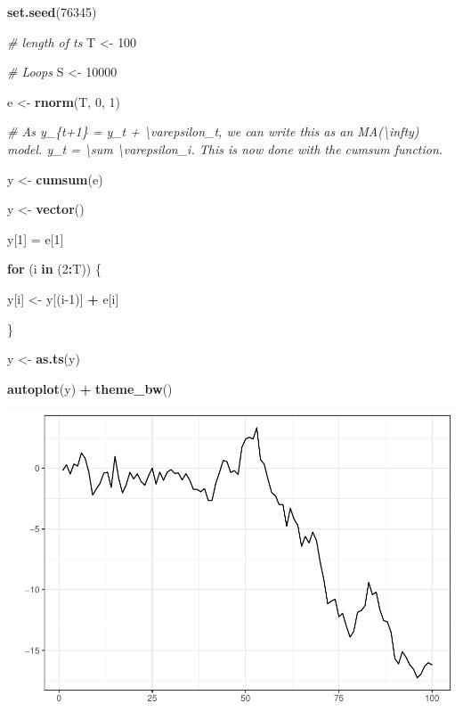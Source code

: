 \documentclass[
]{article}
\newenvironment{Shaded}{\begin{snugshade}}{\end{snugshade}}
\newcommand{\CommentTok}[1]{\textcolor[rgb]{0.56,0.35,0.01}{\textit{#1}}}
\newcommand{\ControlFlowTok}[1]{\textcolor[rgb]{0.13,0.29,0.53}{\textbf{#1}}}
\newcommand{\DecValTok}[1]{\textcolor[rgb]{0.00,0.00,0.81}{#1}}
\newcommand{\KeywordTok}[1]{\textcolor[rgb]{0.13,0.29,0.53}{\textbf{#1}}}
\newcommand{\NormalTok}[1]{#1}
\newcommand{\OperatorTok}[1]{\textcolor[rgb]{0.81,0.36,0.00}{\textbf{#1}}}
\newcommand{\StringTok}[1]{\textcolor[rgb]{0.31,0.60,0.02}{#1}}
\begin{document}
\begin{Shaded}
\begin{Highlighting}[]
\KeywordTok{set.seed}\NormalTok{(}\DecValTok{76345}\NormalTok{)}

\CommentTok{# length of ts}
\NormalTok{T <-}\StringTok{ }\DecValTok{100}

\CommentTok{# Loops}
\NormalTok{S <-}\StringTok{ }\DecValTok{10000}

\NormalTok{e <-}\StringTok{ }\KeywordTok{rnorm}\NormalTok{(T, }\DecValTok{0}\NormalTok{, }\DecValTok{1}\NormalTok{)}

\CommentTok{# As y_\{t+1\} = y_t + \textbackslash{}varepsilon_t, we can write this as an MA(\textbackslash{}infty) model. y_t = \textbackslash{}sum \textbackslash{}varepsilon_i. This is now done with the cumsum function.}

\NormalTok{y <-}\StringTok{ }\KeywordTok{cumsum}\NormalTok{(e)}

\NormalTok{y <-}\StringTok{ }\KeywordTok{vector}\NormalTok{()}

\NormalTok{y[}\DecValTok{1}\NormalTok{] =}\StringTok{ }\NormalTok{e[}\DecValTok{1}\NormalTok{]}

\ControlFlowTok{for}\NormalTok{ (i }\ControlFlowTok{in}\NormalTok{ (}\DecValTok{2}\OperatorTok{:}\NormalTok{T)) \{}

\NormalTok{    y[i] <-}\StringTok{ }\NormalTok{y[(i}\DecValTok{-1}\NormalTok{)] }\OperatorTok{+}\StringTok{ }\NormalTok{e[i]}

\NormalTok{\}}

\NormalTok{y <-}\StringTok{ }\KeywordTok{as.ts}\NormalTok{(y)}

\KeywordTok{autoplot}\NormalTok{(y) }\OperatorTok{+}\StringTok{ }\KeywordTok{theme_bw}\NormalTok{()}
\end{Highlighting}
\end{Shaded}

\begin{center}\includegraphics{Econo2_P6_files/figure-latex/monte carlo 1-1} \end{center}
\end{document}
